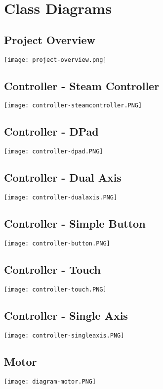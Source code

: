 \section{Class Diagrams}
\lipsum[2]

\subsection{Project Overview}
\texttt{[image: project-overview.png]}

\subsection{Controller - Steam Controller}
\texttt{[image: controller-steamcontroller.PNG]}

\subsection{Controller - DPad}
\texttt{[image: controller-dpad.PNG]}

\subsection{Controller - Dual Axis}
\texttt{[image: controller-dualaxis.PNG]}

\subsection{Controller - Simple Button}
\texttt{[image: controller-button.PNG]}

\subsection{Controller - Touch}
\texttt{[image: controller-touch.PNG]}

\subsection{Controller - Single Axis}
\texttt{[image: controller-singleaxis.PNG]}

\newpage
\subsection{Motor}
\texttt{[image: diagram-motor.PNG]}

\newpage
